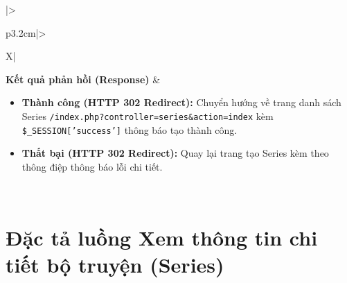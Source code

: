 \begin{table}[H]
\begin{tabularx}{\textwidth}{|>{\raggedright\arraybackslash\bfseries}p{3.2cm}|>{\raggedright\arraybackslash}X|}
\textbf{Kết quả phản hồi (Response)} & 
\begin{minipage}[t]{\linewidth}
    \begin{itemize}[leftmargin=*]
        \item \textbf{Thành công (HTTP 302 Redirect):} Chuyển hướng về trang danh sách Series \texttt{/index.php?}\allowbreak\texttt{controller=series\&}\allowbreak\texttt{action=index} kèm \texttt{\$\_SESSION['success']} thông báo tạo thành công.
        \item \textbf{Thất bại (HTTP 302 Redirect):} Quay lại trang tạo Series kèm theo thông điệp thông báo lỗi chi tiết.
    \end{itemize}
\end{minipage} \\ \hline
\end{tabularx}
\caption{Đặc tả yêu cầu đề xuất Series mới}
\label{tab:api_series_store}
\end{table}

\newpage

\section{Đặc tả luồng Xem thông tin chi tiết bộ truyện (Series)}
\label{sec:api_series_show}

